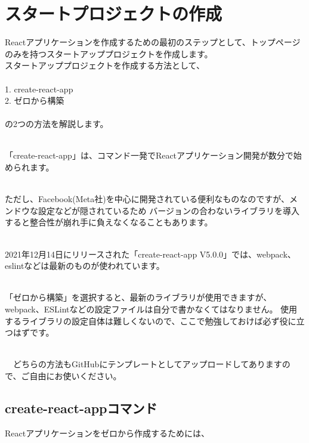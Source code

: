 \chapter{スタートプロジェクトの作成}
\label{chap:02-create-react-app}
\begin{starterabstract}
Reactアプリケーションを作成するための最初のステップとして、トップページのみを持つスタートアッププロジェクトを作成します。
　\\[0pt]

スタートアッププロジェクトを作成する方法として、\\[0pt]
　\\[0pt]
  1. create{-}react{-}app\\[0pt]
  2. ゼロから構築\\[0pt]
　\\[0pt]
の2つの方法を解説します。

　\\[0pt]
「create{-}react{-}app」は、コマンド一発でReactアプリケーション開発が数分で始められます。

　\\[0pt]
ただし、Facebook(Meta社)を中心に開発されている便利なものなのですが、メンドウな設定などが隠されているため
バージョンの合わないライブラリを導入すると整合性が崩れ手に負えなくなることもあります。

　\\[0pt]
2021年12月14日にリリースされた「create{-}react{-}app V5.0.0」では、webpack、eslintなどは最新のものが使われています。

　\\[0pt]
「ゼロから構築」を選択すると、最新のライブラリが使用できますが、webpack、ESLintなどの設定ファイルは自分で書かなくてはなりません。
使用するライブラリの設定自体は難しくないので、ここで勉強しておけば必ず役に立つはずです。

　\\[0pt]
　どちらの方法もGitHubにテンプレートとしてアップロードしてありますので、ご自由にお使いください。

\end{starterabstract}

\section{create{-}react{-}appコマンド}
\keeplastskip{
  \label{sec:2-1}
  \label{sec-01command}
  \par\nobreak
}

Reactアプリケーションをゼロから作成するためには、

